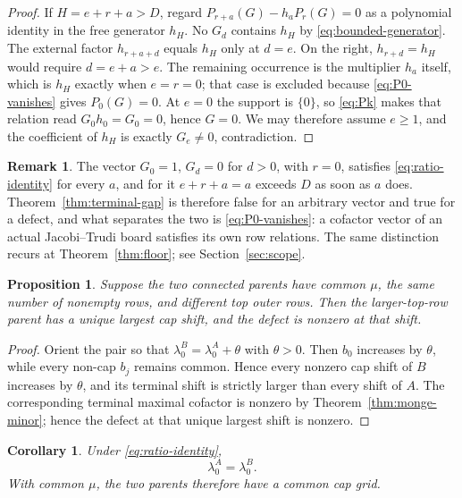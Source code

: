 \documentclass[11pt,a4paper]{amsart}
\numberwithin{equation}{section}
\theoremstyle{plain}
\newtheorem{proposition}[theorem]{Proposition}
\newtheorem{corollary}[theorem]{Corollary}
\theoremstyle{definition}
\newtheorem{remark}[theorem]{Remark}
\begin{document}
\begin{proof}
If \(H=e+r+a>D\), regard \(P_{r+a}(G)-h_aP_r(G)=0\)
as a polynomial identity in the free generator \(h_H\).  No \(G_d\) contains \(h_H\) by \eqref{eq:bounded-generator}.  The external factor \(h_{r+a+d}\) equals \(h_H\) only at \(d=e\).  On the right, \(h_{r+d}=h_H\) would require \(d=e+a>e\).  The remaining occurrence is the multiplier \(h_a\) itself, which is \(h_H\) exactly when \(e=r=0\); that case is excluded because \eqref{eq:P0-vanishes} gives \(P_0(G)=0\).  At \(e=0\) the support is \(\{0\}\), so \eqref{eq:Pk} makes that relation read \(G_0h_0=G_0=0\), hence \(G=0\).  We may therefore assume \(e\ge1\), and the coefficient of \(h_H\) is exactly \(G_e\ne0\), contradiction.
\end{proof}

\begin{remark}\label{rem:realizability-terminal}
The vector \(G_0=1\), \(G_d=0\) for \(d>0\), with \(r=0\), satisfies \eqref{eq:ratio-identity} for every \(a\), and for it \(e+r+a=a\) exceeds \(D\) as soon as \(a\) does.  Theorem~\ref{thm:terminal-gap} is therefore false for an arbitrary vector and true for a defect, and what separates the two is \eqref{eq:P0-vanishes}: a cofactor vector of an actual Jacobi--Trudi board satisfies its own row relations.  The same distinction recurs at Theorem~\ref{thm:floor}; see Section~\ref{sec:scope}.
\end{remark}

\begin{proposition}\label{prop:top-terminal}
Suppose the two connected parents have common \(\mu\), the same number of nonempty rows, and different top outer rows.  Then the larger-top-row parent has a unique largest cap shift, and the defect is nonzero at that shift.
\end{proposition}

\begin{proof}
Orient the pair so that \(\lambda_0^B=\lambda_0^A+\theta\) with \(\theta>0\).  Then \(b_0\) increases by \(\theta\), while every non-cap \(b_j\) remains common.  Hence every nonzero cap shift of \(B\) increases by \(\theta\), and its terminal shift is strictly larger than every shift of \(A\).  The corresponding terminal maximal cofactor is nonzero by Theorem~\ref{thm:monge-minor}; hence the defect at that unique largest shift is nonzero.
\end{proof}

\begin{corollary}\label{cor:cap-fixing}
Under \eqref{eq:ratio-identity},
\[
\lambda_0^A=\lambda_0^B.
\]
With common \(\mu\), the two parents therefore have a common cap grid.
\end{corollary}
\end{document}
